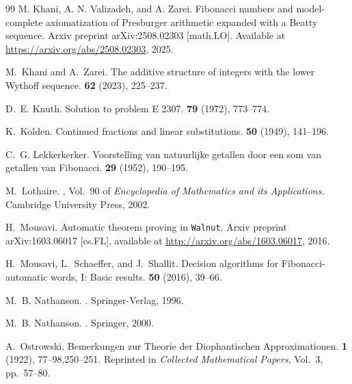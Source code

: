 \documentclass[12pt,reqno]{article}
\begin{document}
\begin{thebibliography}{99}
M. Khani, A. N. Valizadeh, and A. Zarei.
\newblock Fibonacci numbers and model-complete axiomatization of 
{Presburger} arithmetic expanded with a {Beatty} sequence.
\newblock Arxiv preprint arXiv:2508.02303 [math.LO].  Available at
\url{https://arxiv.org/abs/2508.02303}, 2025.

M.~Khani and A.~Zarei.
\newblock The additive structure of integers with the lower {Wythoff} sequence.
 {\bf 62} (2023), 225--237.

D.~E. Knuth.
\newblock Solution to problem {E 2307}.
 {\bf 79} (1972), 773--774.

K.~Kolden.
\newblock Continued fractions and linear substitutions.
 {\bf 50} (1949),
  141--196.

C.~G. Lekkerkerker.
\newblock Voorstelling van natuurlijke getallen door een som van getallen van
  {Fibonacci}.
 {\bf 29} (1952), 190--195.

M.~Lothaire.
, Vol.~90 of {\em Encyclopedia
  of Mathematics and its Applications}.
\newblock Cambridge University Press, 2002.

H.~Mousavi.
\newblock Automatic theorem proving in {{\tt Walnut}}.
\newblock Arxiv preprint arXiv:1603.06017 [cs.FL], available at
  \url{http://arxiv.org/abs/1603.06017}, 2016.

H.~Mousavi, L.~Schaeffer, and J.~Shallit.
\newblock Decision algorithms for {Fibonacci}-automatic words, {I}: {Basic}
  results.
 {\bf 50} (2016), 39--66.

M.~B. Nathanson.
.
\newblock Springer-Verlag, 1996.

M.~B. Nathanson.
.
\newblock Springer, 2000.

A.~Ostrowski.
\newblock Bemerkungen zur {Theorie} der {Diophantischen} {Approximationen}.
 {\bf 1} (1922), 77--98,250--251.
\newblock Reprinted in {\it Collected Mathematical Papers}, Vol.\ 3, pp.\
  57--80.


\end{thebibliography}
\end{document}
